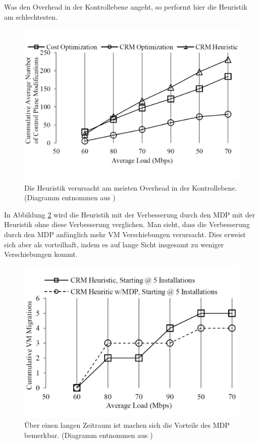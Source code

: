 \documentclass[conference]{IEEEtran}
\begin{document}
Was den Overhead in der Kontrollebene angeht, so performt hier die Heuristik am schlechtesten. 

\begin{figure}[h!]
	\centering
	\includegraphics[trim=0 3cm 0 1cm,scale=0.25]{grafik/CPM.pdf}
	\caption{Die Heuristik verursacht am meisten Overhead in der Kontrollebene.
	(Diagramm entnommen aus \cite{IEEEhowto:orig})}
	\label{img:CPM}
\end{figure}


In Abbildung \ref{img:MDP} wird die Heuristik mit der Verbesserung durch den MDP mit der Heuristik ohne diese Verbesserung verglichen. Man sieht, dass die Verbesserung durch den MDP  anfänglich mehr VM Verschiebungen verursacht. Dies erweist sich aber als vorteilhaft, indem es auf lange Sicht insgesamt zu weniger Verschiebungen kommt.

\begin{figure}[h!]
	\centering
	\includegraphics[trim=0 2cm 0 1cm,scale=0.25]{grafik/MDP.pdf}
	\caption{Über einen langen Zeitraum ist machen sich die Vorteile des MDP bemerkbar.
	(Diagramm entnommen aus \cite{IEEEhowto:orig})}
	\label{img:MDP}
\end{figure}
\end{document}
